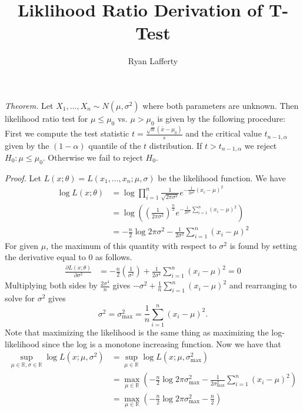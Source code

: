 \documentclass[11pt]{article} %
\title{Liklihood Ratio Derivation of T-Test}
\author{Ryan Lafferty}
\begin{document}
\maketitle

\emph{Theorem.} Let $X_1,...,X_n \sim N(\mu,\sigma^2)$ where both parameters are unknown. Then likelihood ratio test for $\mu\le \mu_0$ vs. $\mu>\mu_0$ is given by the following procedure: First we compute the test statistic $t = \frac{\sqrt{n}(\bar{x}-\mu_0)}{s}$ and the critical value $t_{n-1,\alpha}$ given by the $(1-\alpha)$ quantile of the $t$ distribution. If $t>t_{n-1,\alpha}$ we reject $H_0: \mu\le \mu_0$. Otherwise we fail to reject $H_0$. 

\emph{Proof.} Let $L(x; \theta) = L(x_1,...,x_n; \mu, \sigma)$ be the likelihood function. We have 
\begin{align*}
\log L(x;\theta) &= \log\prod_{i=1}^n \frac{1}{\sqrt{2\pi \sigma^2}}e^{-\frac{1}{2\sigma^2}(x_i - \mu)^2}\\
& = \log\left(\left(\frac{1}{2\pi \sigma^2}\right)^{\frac{n}2} e^{-\frac{1}{2\sigma^2}\sum_{i = 1}^n (x_i-\mu)^2}\right)\\
& = -\frac{n}2 \log 2\pi \sigma^2  -\frac{1}{2\sigma^2}\sum_{i = 1}^n (x_i-\mu)^2
\end{align*}
For given $\mu$, the maximum of this quantity with respect to $\sigma^2$ is found by setting the derivative equal to $0$ as follows.
\begin{align*}
\frac{\partial L(x;\theta)}{\partial \sigma^2} &= -\frac{n}2 \left(\frac{1}{\sigma^2}\right) + \frac{1}{2\sigma^4}\sum_{i = 1}^n (x_i-\mu)^2 = 0 
\end{align*}
Multiplying both sides by $\frac{2 \sigma^4}{n}$ gives $-\sigma^2 + \frac{1}n \sum_{i = 1}^n (x_i-\mu)^2$ and rearranging to solve for $\sigma^2 $ gives $$\sigma^2 = \sigma_{\text{max}}^2 = \frac{1}n \sum_{i = 1}^n (x_i-\mu)^2.$$ Note that maximizing the likelihood is the same thing as maximizing the log-likelihood since the log is a monotone increasing function. 
\newcommand{\sm}{\sigma_{\text{max}}}
Now we have that \begin{align*}
\sup_{\mu \in \mathbb{R}, \sigma \in \mathbb{R}} \log L(x;\mu, \sigma^2) & = 
\sup_{\mu \in \mathbb{R}}  \log L(x;\mu, \sigma_{\text{max}}^2) \\
& = \max_{\mu \in \mathbb{R}} \left(-\frac{n}2 \log 2\pi \sigma_{\text{max}}^2  -\frac{1}{2\sm^2}\sum_{i = 1}^n (x_i-\mu)^2\right)\\
& =  \max_{\mu \in \mathbb{R}} \left(-\frac{n}2 \log 2\pi \sigma_{\text{max}}^2  -\frac{n}2\right)
\end{align*}
\end{document}
